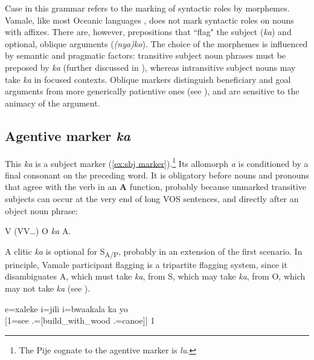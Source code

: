 Case in this grammar refers to the marking of syntactic roles by morphemes. Vamale, like most Oceanic languages \parencites[37]{lynch_oceanic_2002}[496]{ross_morphosyntactic_2004}, does not mark syntactic roles on nouns with affixes. There are, however, prepositions that ``flag" the subject (\textit{ka}) and optional, oblique arguments (\textit{(nya)ko}). The choice of the morphemes is influenced by semantic and pragmatic factors: transitive subject noun phrases must be preposed by \textit{ka} (further discussed in ), whereas intransitive subject nouns may take \textit{ka} in focused contexts. Oblique markers distinguish beneficiary and goal arguments from more generically patientive ones (see ), and are sensitive to the animacy of the argument.

\subsection{Agentive marker \textit{ka} }
\label{ssec:ka}

This \textit{ka} is a subject marker (\ref{ex:sbj marker}).\footnote{The Pije cognate to the agentive marker is \textit{lu}.} Its allomorph \textit{a} is conditioned by a final consonant on the preceding word. It is obligatory before nouns and pronouns that agree with the verb in an \textbf{A} function, probably because unmarked transitive subjects can occur at the very end of long VOS sentences, and directly after an object noun phrase: 

\ea V (VV\ldots) O \textit{ka} A. \z

\noindent A clitic \textit{ka} is optional for S\textsubscript{A/P}, probably in an extension of the first scenario. In principle, Vamale participant flagging is a tripartite flagging system, since it disambiguates A, which must take \textit{ka}, from S, which may take \textit{ka}, from O, which may not take \textit{ka} (see ). %

\ea
\label{ex:sbj marker}
\gll 	{\ob}e=xaleke i={\ob}jili i=bwaakala{\cb\cb} ka yo	\\
	{[}1=see .=[build\_with\_wood .=canoe]]  1	\\
\glt  {}		
\z

%

